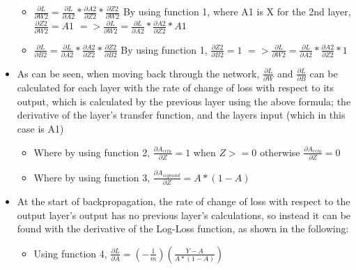 \documentclass[./project-report/src/latex/project-report.tex]{subfiles}
\begin{document}
\begin{itemize}
\begin{itemize}
        \item $\frac{\partial{L}}{\partial{W2}} = \frac{\partial{L}}{\partial{A2}} * \frac{\partial{A2}}{\partial{Z2}} * \frac{\partial{Z2}}{\partial{W2}}$
              \vspace{1mm}
              \newline
              By using function 1, where A1 is X for the 2nd layer, $\frac{\partial{Z2}}{\partial{W2}} = A1$
              \vspace{1mm}
              \newline
              $=> \frac{\partial{L}}{\partial{W2}} = \frac{\partial{L}}{\partial{A2}} * \frac{\partial{A2}}{\partial{Z2}} * A1$
        \item $\frac{\partial{L}}{\partial{B2}} = \frac{\partial{L}}{\partial{A2}} * \frac{\partial{A2}}{\partial{Z2}} * \frac{\partial{Z2}}{\partial{B2}}$
              \vspace{1mm}
              \newline
              By using function 1, $\frac{\partial{Z2}}{\partial{B2}} = 1$
              \vspace{1mm}
              \newline
              $=> \frac{\partial{L}}{\partial{W2}} = \frac{\partial{L}}{\partial{A2}} * \frac{\partial{A2}}{\partial{Z2}} * 1$
    \end{itemize}
    \item As can be seen, when moving back through the network, $\frac{\partial{L}}{\partial{W}}$ and $\frac{\partial{L}}{\partial{B}}$ can be calculated for each layer 
		  with the rate of change of loss with respect to its output, which is calculated by the previous layer using the above formula; the derivative of 
          the layer's transfer function, and the layers input (which in this case is A1)
    \begin{itemize}
        \item Where by using function 2, $\frac{\partial{A_{relu}}}{\partial{Z}} = 1$ when $Z >= 0$ otherwise $\frac{\partial{A_{relu}}}{\partial{Z}} = 0$
        \item Where by using function 3, $\frac{\partial{A_{sigmoid}}}{\partial{Z}} = A * (1 - A)$
    \end{itemize}
    \item At the start of backpropagation, the rate of change of loss with respect to the output layer's output has no previous layer's calculations, so instead it can 
          be found with the derivative of the Log-Loss function, as shown in the following:
    \begin{itemize}
        \item Using function 4, $\frac{\partial{L}}{\partial{A}} = (-\frac{1}{m})(\frac{Y-A}{A * (1-A)})$
    \end{itemize}
\end{itemize}
\end{document}
